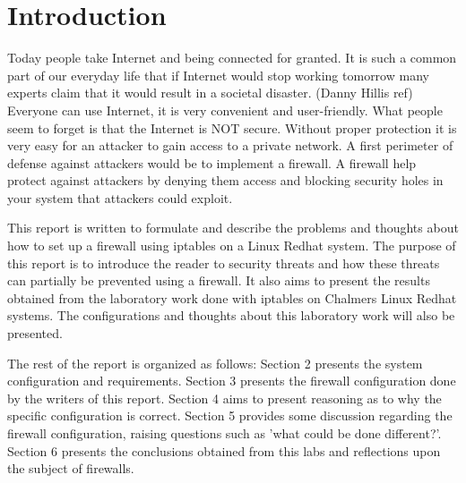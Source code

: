 \section{Introduction} 
\label{sec:intro}
Today people take Internet and being connected for granted. It is such a common part of our everyday life that if Internet would stop working tomorrow many experts claim that it would result in a societal disaster. (Danny Hillis ref) Everyone can use Internet, it is very convenient and user-friendly. What people seem to forget is that the Internet is NOT secure. Without proper protection it is very easy for an attacker to gain access to a private network. A first perimeter of defense against attackers would be to implement a firewall. A firewall help protect against attackers by denying them access and blocking security holes in your system that attackers could exploit.

This report is written to formulate and describe the problems and thoughts about how to set up a firewall using iptables on a Linux Redhat system. The purpose of this report is to introduce the reader to security threats and how these threats can partially be prevented using a firewall. It also aims to present the results obtained from the laboratory work done with iptables on Chalmers Linux Redhat systems. The configurations and thoughts about this laboratory work will also be presented.

The rest of the report is organized as follows: Section 2 presents the system configuration and requirements. Section 3 presents the firewall configuration done by the writers of this report. Section 4 aims to present reasoning as to why the specific configuration is correct. Section 5 provides some discussion regarding the firewall configuration, raising questions such as 'what could be done different?'. Section 6 presents the conclusions obtained from this labs and reflections upon the subject of firewalls.



